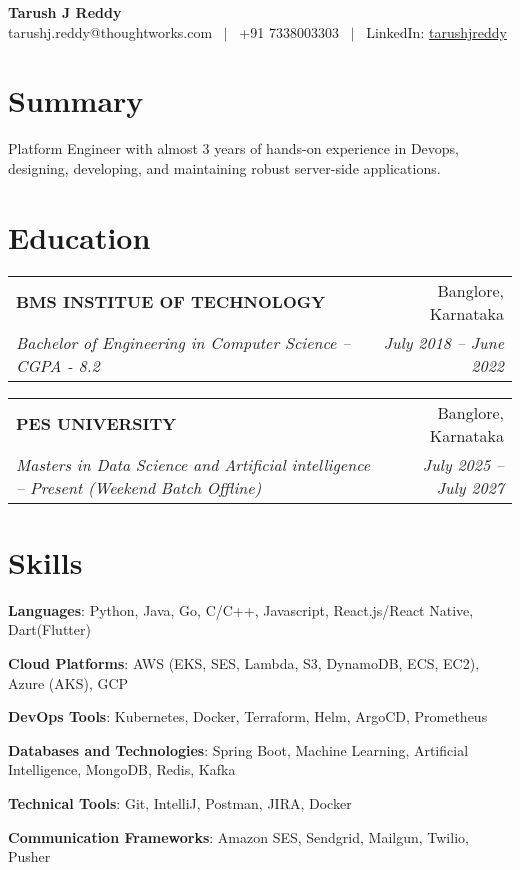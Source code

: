 \documentclass[letterpaper,11pt]{article}
\makeatletter
\newcommand{\resumeSubheading}[4]{
  \vspace{-1pt}\item
    \begin{tabular*}{0.97\textwidth}{l@{\extracolsep{\fill}}r}
      \textbf{#1} & #2 \\
      \textit{\small#3} & \textit{\small #4} \\
    \end{tabular*}
}
\newcommand{\resumeSubHeadingListStart}{
  \begin{list}{}{
    \setlength\leftmargin{0pt} %
    \setlength\itemindent{0pt} %
    \setlength\itemsep{-3pt}   %
    \setlength\parskip{0pt}    %
  }
}
\newcommand{\resumeSubHeadingListEnd}{\end{list}}
\makeatother
\begin{document}
\begin{center}
    \textbf{{\huge Tarush J Reddy}}\\
    \vspace{5pt} %
    tarushj.reddy@thoughtworks.com \ $|$ \ +91 7338003303 \ $|$ \ LinkedIn: \href{https://www.linkedin.com/in/brighu-raina-66687b1a6/}{ tarushjreddy}
\end{center}

\section{Summary}
  \resumeSubHeadingListStart
    \item{{Platform Engineer  with almost 3 years of hands-on experience in Devops, designing, developing, and maintaining robust server-side applications.}}
  \resumeSubHeadingListEnd
  
\section{Education}
  \resumeSubHeadingListStart
    \resumeSubheading
      {BMS INSTITUE OF TECHNOLOGY}{Banglore, Karnataka}
      {Bachelor of Engineering in Computer Science – CGPA - 8.2 }{July 2018 – June 2022}


    \resumeSubheading
      {PES UNIVERSITY}{Banglore, Karnataka}
      {Masters in Data Science and Artificial intelligence – Present (Weekend Batch Offline) }{July 2025 – July 2027}
  \resumeSubHeadingListEnd


\section{Skills}
 \resumeSubHeadingListStart
    \item{\textbf{Languages}{: Python, Java, Go, C/C++, Javascript, React.js/React Native, Dart(Flutter) }}
    \item{\textbf{Cloud Platforms}{: AWS (EKS, SES, Lambda, S3, DynamoDB, ECS, EC2), Azure (AKS), GCP}}
    \item{\textbf{DevOps Tools}{: Kubernetes, Docker, Terraform, Helm, ArgoCD, Prometheus}}
    \item{\textbf{Databases and Technologies}{: Spring Boot, Machine Learning, Artificial Intelligence, MongoDB, Redis, Kafka}}
    \item{\textbf{Technical Tools}{: Git, IntelliJ, Postman, JIRA, Docker}}
    \item{\textbf{Communication Frameworks}{: Amazon SES, Sendgrid, Mailgun, Twilio, Pusher}}
 \resumeSubHeadingListEnd
\end{document}
